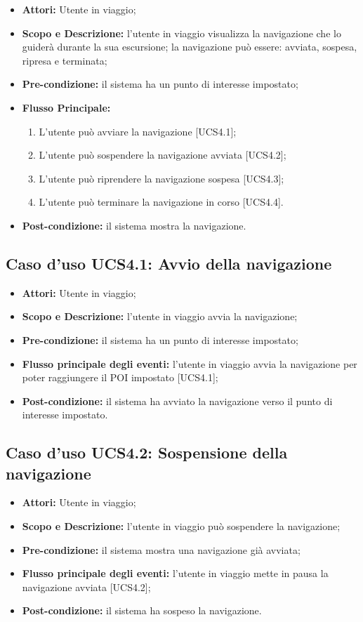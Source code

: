 \begin{itemize}
\item \textbf{Attori:} Utente in viaggio;
\item \textbf{Scopo e Descrizione:} l'utente in viaggio visualizza la navigazione che lo guiderà durante la sua escursione; la navigazione può essere: avviata, sospesa, ripresa e terminata;
\item \textbf{Pre-condizione:} il sistema ha un punto di interesse impostato;
\item \textbf{Flusso Principale:} 
\begin{enumerate}
\item L'utente può avviare la navigazione [UCS4.1];
\item L'utente può sospendere la navigazione avviata [UCS4.2];
\item L'utente può riprendere la navigazione sospesa [UCS4.3];
\item L'utente può terminare la navigazione in corso [UCS4.4].
\end{enumerate}
\item \textbf{Post-condizione:} il sistema mostra la navigazione.
\end{itemize}

\subsection{Caso d'uso UCS4.1: Avvio della navigazione}
\begin{itemize}
\item \textbf{Attori:} Utente in viaggio;
\item \textbf{Scopo e Descrizione:} l'utente in viaggio avvia la navigazione;
\item \textbf{Pre-condizione:} il sistema ha un punto di interesse impostato;
\item \textbf{Flusso principale degli eventi:} l'utente in viaggio avvia la navigazione per poter raggiungere il POI impostato [UCS4.1];
\item \textbf{Post-condizione:} il sistema ha avviato la navigazione verso il punto di interesse impostato.
\end{itemize}

\subsection{Caso d'uso UCS4.2: Sospensione della navigazione}
\begin{itemize}
\item \textbf{Attori:} Utente in viaggio;
\item \textbf{Scopo e Descrizione:} l'utente in viaggio può sospendere la navigazione;
\item \textbf{Pre-condizione:} il sistema mostra una navigazione già avviata;
\item \textbf{Flusso principale degli eventi:} l'utente in viaggio mette in pausa la navigazione avviata [UCS4.2];
\item \textbf{Post-condizione:} il sistema ha sospeso la navigazione.
\end{itemize}

